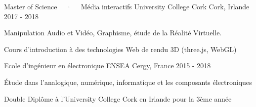 

\begin{cventries}

	\cventry
	{Master of Science ~~·~~ Média interactifs} %
	{University College Cork} %
	{Cork, Irlande} %
	{2017 - 2018} %
	{
		\begin{cvitems} %
			\item {Manipulation Audio et Vidéo, Graphisme, étude de la Réalité Virtuelle.}
			\item {Cours d'introduction à des technologies Web de rendu 3D (three.js, WebGL)}
		\end{cvitems}
	}

	\cventry
	{Ecole d'ingénieur en électronique}
	{ENSEA} %
	{Cergy, France} %
	{2015 - 2018} %
	{
		\begin{cvitems} %
			\item {Étude dans l’analogique, numérique, informatique et les composants électroniques}
			\item {Double Diplôme à l’University College Cork en Irlande pour la 3ème année}
		\end{cvitems}
	}
\end{cventries}
